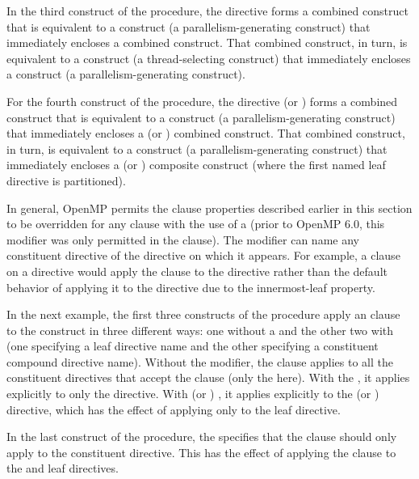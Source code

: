 In the third construct of the procedure, the directive  forms a combined construct that is equivalent to a 
construct (a parallelism-generating construct) that immediately encloses
a  combined construct. That combined construct, in turn,
is equivalent to a  construct (a thread-selecting
construct) that immediately encloses a  construct (a
parallelism-generating construct).

For the fourth construct of the procedure, the directive  (or ) forms
a combined construct that is equivalent to a  construct (a
parallelism-generating construct) that immediately encloses a  (or ) combined
construct. That combined construct, in turn, is equivalent to a 
construct (a parallelism-generating construct) that immediately encloses
a  (or ) composite
construct (where the first named leaf directive is partitioned).


In general, OpenMP permits the clause properties described earlier in this
section to be overridden for any clause with the use of a
 (prior to OpenMP 6.0, this modifier was only
permitted in the  clause). The modifier can name any constituent
directive of the directive on which it appears. For example, a
 clause on a  directive would
apply the  clause to the  directive rather than
the default behavior of applying it to the  directive due to the
innermost-leaf property.

In the next example, the first three constructs of the
 procedure apply an  clause to the
 construct in three different ways: one without a
 and the other two with
 (one specifying a leaf directive name and the
other specifying a constituent compound directive name). Without the modifier,
the  clause applies to all the constituent directives that accept the
 clause (only the  here). With the 
, it applies explicitly to only the
 directive. With  (or )
, it applies explicitly to the  (or ) directive, which has the effect of applying only
to the  leaf directive.

In the last construct of the procedure, the  specifies
that the  clause should only apply to the 
constituent directive. This has the effect of applying the  clause to
the  and  leaf directives.

